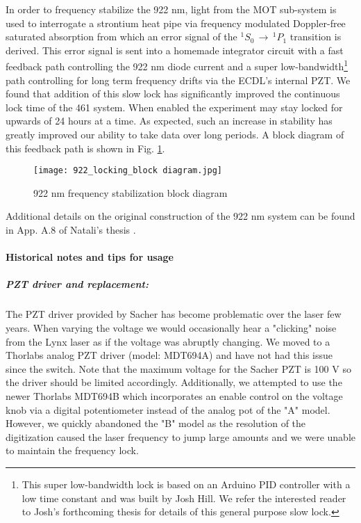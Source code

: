 In order to frequency stabilize the 922 nm, light from the MOT sub-system is used to interrogate a strontium heat pipe via frequency modulated Doppler-free saturated absorption from which an error signal of the $^1S_0\,\rightarrow\,^1P_1$ transition is derived.
This error signal is sent into a homemade integrator circuit with a fast feedback path controlling the 922 nm diode current and a super low-bandwidth\footnote{This super low-bandwidth lock is based on an Arduino PID controller with a low time constant and was built by Josh Hill.
We refer the interested reader to Josh's forthcoming thesis for details of this general purpose slow lock.} 
path controlling for long term frequency drifts via the ECDL's internal PZT.
We found that addition of this slow lock has significantly improved the continuous lock time of the 461 system. 
When enabled the experiment may stay locked for upwards of 24 hours at a time. 
As expected, such an increase in stability has greatly improved our ability to take data over long periods.
A block diagram of this feedback path is shown in Fig. \ref{fig:922freqLock}.
	\begin{figure}
		\centerline{
		\texttt{[image: 922\_locking\_block diagram.jpg]}}
		\caption{922 nm frequency stabilization block diagram}{}
		\label{fig:922freqLock}
	\end{figure} 

Additional details on the original construction of the 922 nm system can be found in App. A.8 of Natali's thesis \cite{MartinezdeEscolar2010}.

\paragraph{Historical notes and tips for usage}
\subparagraph{PZT driver and replacement:}
The PZT driver provided by Sacher has become problematic over the laser few years.
When varying the voltage we would occasionally hear a "clicking" noise from the Lynx laser as if the voltage was abruptly changing.
We moved to a Thorlabs analog PZT driver (model: MDT694A) and have not had this issue since the switch.
Note that the maximum voltage for the Sacher PZT is 100 V so the driver should be limited accordingly.
Additionally, we attempted to use the newer Thorlabs MDT694B which incorporates an enable control on the voltage knob via a digital potentiometer instead of the analog pot of the "A" model.
However, we quickly abandoned the "B" model as the resolution of the digitization caused the laser frequency to jump large amounts and we were unable to maintain the frequency lock.


